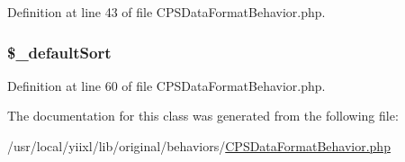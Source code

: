 Definition at line 43 of file CPSDataFormatBehavior.php.

\hypertarget{classCPSDataFormatBehavior_a295ce02e7bc05505ee0456d4292c3418}{
\subsubsection[{\$\_\-defaultSort}]{\setlength{\rightskip}{0pt plus 5cm}\$\_\-defaultSort}}
\label{classCPSDataFormatBehavior_a295ce02e7bc05505ee0456d4292c3418}


Definition at line 60 of file CPSDataFormatBehavior.php.



The documentation for this class was generated from the following file:\begin{DoxyCompactItemize}
\item 
/usr/local/yiixl/lib/original/behaviors/\hyperlink{CPSDataFormatBehavior_8php}{CPSDataFormatBehavior.php}\end{DoxyCompactItemize}
